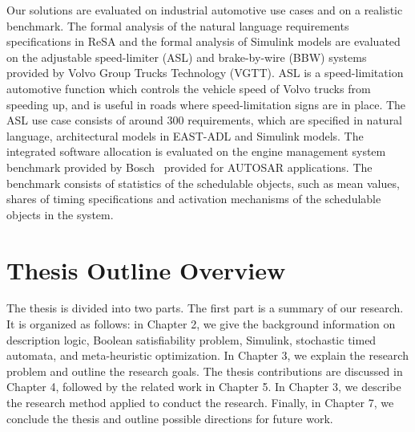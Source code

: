 Our solutions are evaluated on industrial automotive use cases and on a realistic benchmark. The formal analysis of the natural language requirements specifications in ReSA and the formal analysis of Simulink models are evaluated on the adjustable speed-limiter (ASL) and brake-by-wire (BBW) systems provided by Volvo Group Trucks Technology (VGTT). ASL is a speed-limitation automotive function which controls the vehicle speed of Volvo trucks from speeding up, and is useful in roads where speed-limitation signs are in place. The ASL use case consists of around 300 requirements, which are specified in natural language, architectural models in EAST-ADL and Simulink models. The integrated software allocation is evaluated on the engine management system benchmark provided by Bosch~\cite{} provided for AUTOSAR applications. The benchmark consists of statistics of the schedulable objects, such as mean values, shares of timing specifications and activation mechanisms of the schedulable objects in the system.

\section{Thesis Outline Overview}
The thesis is divided into two parts. The first part is a summary of our research. It is organized as follows: in Chapter 2, we give the background information on description logic, Boolean satisfiability problem, Simulink, stochastic timed automata, and meta-heuristic optimization. In Chapter 3, we explain the research problem and outline the research goals. The thesis contributions are discussed in Chapter 4, followed by the related work in Chapter 5. In Chapter 3, we describe the research method applied to conduct the research. Finally, in Chapter 7, we conclude the thesis and outline possible directions for future work.

